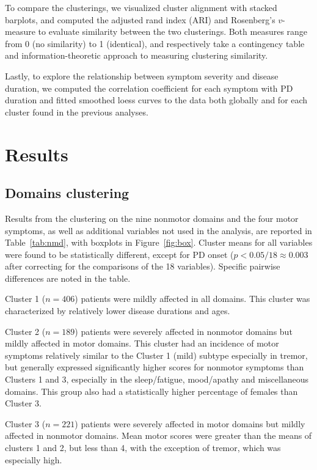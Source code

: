 \documentclass[preprint,5p]{elsarticle} %
\begin{document}
To compare the clusterings, we visualized cluster alignment with stacked barplots, and computed the adjusted rand index\cite{hubert1985} (ARI) and
Rosenberg's $v$-measure\cite{rosenberg07vmeasure} to evaluate similarity between the two
clusterings. Both measures range from 0 (no similarity) to 1 (identical), and respectively take a
contingency table and information-theoretic approach to measuring clustering similarity.

Lastly, to explore the relationship between symptom severity and disease duration, we computed the
correlation coefficient for each symptom with PD duration and fitted smoothed loess curves to the
data both globally and for each cluster found in the previous analyses.

\section{Results}

\subsection{Domains clustering}

Results from the clustering on the nine nonmotor domains and the four motor symptoms, as well as
additional variables not used in the analysis, are reported in Table~\ref{tab:nmd}, with boxplots
in Figure~\ref{fig:box}.
Cluster means for all variables were found to be statistically different, except for PD onset ($p <
0.05 / 18 \approx 0.003$ after correcting for the comparisons of the 18 variables). Specific
pairwise differences are noted in the table.

Cluster 1 ($n = 406$) patients were mildly affected in all domains. This cluster was characterized
by relatively lower disease durations and ages.

Cluster 2 ($n = 189$) patients were severely affected in nonmotor domains but mildly affected in
motor domains. This cluster had an incidence of motor symptoms relatively similar to the Cluster 1
(mild) subtype especially in tremor, but generally expressed significantly higher scores for
nonmotor symptoms than Clusters 1 and 3, especially in the sleep/fatigue, mood/apathy and
miscellaneous domains. This group also had a statistically higher percentage of females than
Cluster 3.

Cluster 3 ($n = 221$) patients were severely affected in motor domains but mildly affected in
nonmotor domains. Mean motor scores were greater than the means of clusters 1 and 2, but less than
4, with the exception of tremor, which was especially high.
\end{document}
